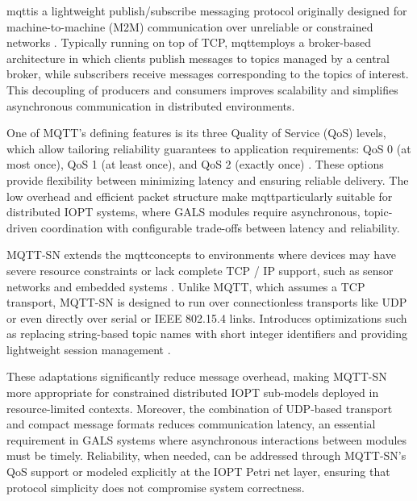 \gls{mqtt}is a lightweight publish/subscribe messaging protocol originally designed for machine-to-machine (M2M) communication over unreliable or constrained networks \cite{oasis2019mqtt, banks2014mqtt}. Typically running on top of TCP, \gls{mqtt}employs a broker-based architecture in which clients publish messages to topics managed by a central broker, while subscribers receive messages corresponding to the topics of interest. This decoupling of producers and consumers improves scalability and simplifies asynchronous communication in distributed environments.

One of MQTT’s defining features is its three Quality of Service (QoS) levels, which allow tailoring reliability guarantees to application requirements: QoS 0 (at most once), QoS 1 (at least once), and QoS 2 (exactly once) \cite{oasis2019mqtt}. These options provide flexibility between minimizing latency and ensuring reliable delivery. The low overhead and efficient packet structure make \gls{mqtt}particularly suitable for distributed IOPT systems, where GALS modules require asynchronous, topic-driven coordination with configurable trade-offs between latency and reliability.

MQTT-SN extends the \gls{mqtt}concepts to environments where devices may have severe resource constraints or lack complete TCP / IP support, such as sensor networks and embedded systems \cite{singh2015mqttsn, confusion2013mqttsn}. Unlike MQTT, which assumes a TCP transport, MQTT-SN is designed to run over connectionless transports like UDP or even directly over serial or IEEE 802.15.4 links. Introduces optimizations such as replacing string-based topic names with short integer identifiers and providing lightweight session management \cite{singh2015mqttsn}. 

These adaptations significantly reduce message overhead, making MQTT-SN more appropriate for constrained distributed IOPT sub-models deployed in resource-limited contexts. Moreover, the combination of UDP-based transport and compact message formats reduces communication latency, an essential requirement in GALS systems where asynchronous interactions between modules must be timely. Reliability, when needed, can be addressed through MQTT-SN’s QoS support or modeled explicitly at the IOPT Petri net layer, ensuring that protocol simplicity does not compromise system correctness.

